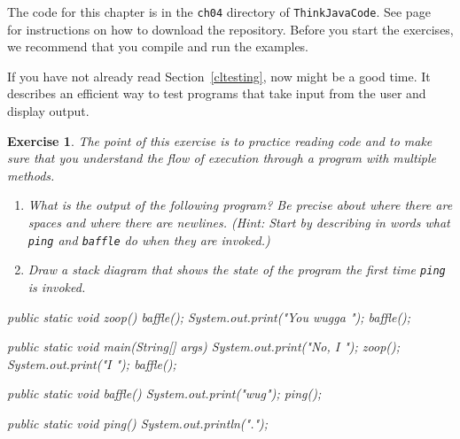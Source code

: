 \documentclass[12pt]{book}
\theoremstyle{exercise}
\newtheorem{exercise}{Exercise}[chapter]
\newcommand{\java}[1]{\verb"#1"}
\begin{document}
The code for this chapter is in the {\tt ch04} directory of {\tt ThinkJavaCode}.
See page~\pageref{code} for instructions on how to download the repository.
Before you start the exercises, we recommend that you compile and run the examples.

If you have not already read Section~\ref{cltesting}, now might be a good time.
It describes an efficient way to test programs that take input from the user and display output.


\begin{exercise}

The point of this exercise is to practice reading code and to make sure that you understand the flow of execution through a program with multiple methods.

\begin{enumerate}

\item What is the output of the following program?
Be precise about where there are spaces and where there are newlines.
(Hint: Start by describing in words what \java{ping} and \java{baffle} do when they are invoked.)

\item Draw a stack diagram that shows the state of the program the first time \java{ping} is invoked.


\end{enumerate}

\begin{code}
    public static void zoop() {
        baffle();
        System.out.print("You wugga ");
        baffle();
    }

    public static void main(String[] args) {
        System.out.print("No, I ");
        zoop();
        System.out.print("I ");
        baffle();
    }

    public static void baffle() {
        System.out.print("wug");
        ping();
    }

    public static void ping() {
        System.out.println(".");
    }
\end{code}

\end{exercise}



\end{document}
